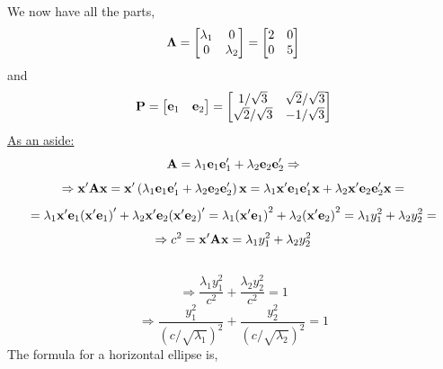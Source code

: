         We now have all the parts,
        \[
            \bold{\Lambda}
            =
            \begin{bmatrix}
                \lambda_1 & 0 \\
                0 & \lambda_2
            \end{bmatrix}
            =
            \begin{bmatrix}
                2 & 0 \\
                0 & 5
            \end{bmatrix}
        \]
        and
        \[
            \bold{P}
            =
            \begin{bmatrix}
                \bold{e}_1 & \bold{e}_2
            \end{bmatrix}
            =
            \begin{bmatrix}
                1/\sqrt{3} & \sqrt{2}/\sqrt{3} \\
                \sqrt{2}/\sqrt{3} & -1/\sqrt{3}
            \end{bmatrix}
        \]
        \underline{As an aside:}
        \[
            \bold{A} = \lambda_1\bold{e}_1\bold{e}_1^\prime + \lambda_2\bold{e}_2\bold{e}_2^\prime
            \Rightarrow
        \]
        \[
            \Rightarrow
            \bold{x}^\prime\bold{A}\bold{x}
            =
            \bold{x}^\prime\left(\lambda_1\bold{e}_1\bold{e}_1^\prime + \lambda_2\bold{e}_2\bold{e}_2^\prime\right)\bold{x}
            =
            \lambda_1\bold{x}^\prime\bold{e}_1\bold{e}_1^\prime\bold{x} + \lambda_2\bold{x}^\prime\bold{e}_2\bold{e}_2^\prime\bold{x}
            =
        \]
        \[
            =
            \lambda_1\bold{x}^\prime\bold{e}_1{\left(\bold{x}^\prime\bold{e}_1\right)}^\prime + \lambda_2\bold{x}^\prime\bold{e}_2{\left(\bold{x}^\prime\bold{e}_2\right)}^\prime
            =
            \lambda_1{\left(\bold{x}^\prime\bold{e}_1\right)}^2 + \lambda_2{\left(\bold{x}^\prime\bold{e}_2\right)}^2
            =
            \lambda_1y_1^2 + \lambda_2y_2^2
            =
        \]
        \[
            \Rightarrow
            c^2
            = 
            \bold{x}^\prime\bold{A}\bold{x}
            =
            \lambda_1y_1^2 + \lambda_2y_2^2
        \]\
        \[
            \Rightarrow
            \frac{\lambda_1y_1^2}{c^2} + \frac{\lambda_2y_2^2}{c^2}
            =
            1
        \]
        \[
            \Rightarrow
            \frac{y_1^2}{{\left(c/\sqrt{\lambda_1}\right)}^2} + \frac{y_2^2}{{\left(c/\sqrt{\lambda_2}\right)}^2}
            =
            1
        \]
        The formula for a horizontal ellipse is,
